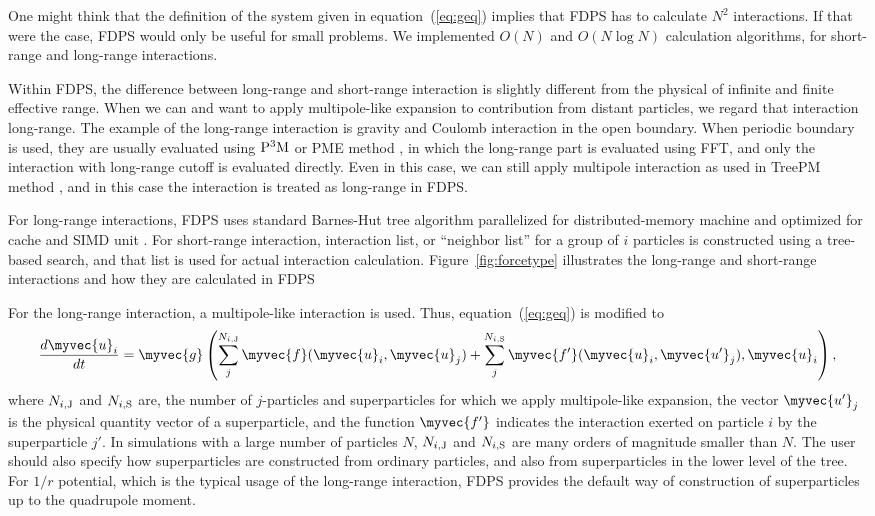 One might think that the definition of the system given in
equation~(\ref{eq:geq})  implies that  FDPS has to calculate $N^2$
interactions. If that were the case, FDPS would only be useful for
small problems. We implemented $O(N)$ and $O(N\log N)$ calculation
algorithms, for short-range and long-range interactions.

Within FDPS, the difference between long-range and short-range
interaction is slightly different from the physical of infinite and
finite effective range. When we can and want to apply multipole-like
expansion to contribution from distant particles, we regard that
interaction long-range. The example of the long-range interaction is
gravity and Coulomb interaction in the open boundary. When periodic
boundary is used, they are usually evaluated using $\rm P^3M$ or PME
method \cite{hockney1988computer}, in which the long-range part is
evaluated using FFT, and only the interaction with long-range cutoff
is evaluated directly.  Even in this case, we can still apply
multipole interaction as used in TreePM method
\cite{1995ApJS...98..355X, 2000ApJS..128..561B, 2002JApA...23..185B,
  2004NewA....9..111D, springel:gadget2, 2005PASJ...57..849Y,
  ishiyama:greem, ishiyama:gordonbell}, and in this case the
interaction is treated as long-range in FDPS.

For long-range interactions, FDPS uses standard Barnes-Hut tree
algorithm \cite{1986Natur.324..446B, 1990JCoPh..87..161B} parallelized
for distributed-memory machine and optimized for cache and SIMD unit
\cite{ishiyama:greem, ishiyama:gordonbell}. For short-range
interaction, interaction list, or ``neighbor list'' for a group of $i$
particles is constructed using a tree-based search, and that list is
used for actual interaction calculation.  Figure~\ref{fig:forcetype}
illustrates the long-range and short-range interactions and how they
are calculated in FDPS

For the long-range interaction, a multipole-like interaction is
used. Thus, equation~(\ref{eq:geq}) is modified to 
\begin{align}
  \frac{d\myvec{u}_i}{dt} = \myvec{g}\left( \sum_j^{N_{i,\rm J}}
  \myvec{f}(\myvec{u}_i,\myvec{u}_j) + \sum_j^{N_{i,\rm S}}
  \myvec{f'}(\myvec{u}_i,\myvec{u'}_j), \myvec{u}_i
  \right), \label{eq:geqL}
\end{align}
where $N_{i,\rm J}$ and $N_{i,\rm S}$ are,  the number of
$j$-particles and superparticles for which we apply multipole-like
expansion, the vector $\myvec{u'}_j$ is the 
physical quantity vector of a superparticle, and the function
$\myvec{f'}$ indicates the interaction  exerted on particle $i$ by the
superparticle $j'$. In simulations with a large number of particles
$N$,  $N_{i, \rm J}$ and $N_{i,\rm S}$ are many orders of magnitude
smaller than $N$.  The user should also specify how superparticles are
constructed from ordinary particles, and also from superparticles in
the lower level of the tree. For $1/r$ potential, which is the typical
usage of the long-range interaction, FDPS provides the default way of
construction of superparticles up to the quadrupole moment. 

